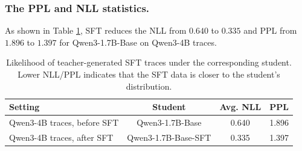 \subsubsection{The PPL and NLL statistics.}


As shown in Table \ref{tab:sft_trace_likelihood}, SFT
reduces the NLL from $0.640$ to $0.335$ and PPL from $1.896$ to $1.397$ for
Qwen3-1.7B-Base on Qwen3-4B traces.



\begin{table}[h]
\centering
\small
\begin{tabular}{lccc}
\toprule
Setting & Student & Avg. NLL & PPL \\
\midrule
Qwen3-4B traces, before SFT & Qwen3-1.7B-Base & 0.640 & 1.896 \\
Qwen3-4B traces, after SFT  & Qwen3-1.7B-Base-SFT & 0.335 & 1.397 \\
\bottomrule
\end{tabular}
\caption{
Likelihood of teacher-generated SFT traces under the corresponding student.
Lower NLL/PPL indicates that the SFT data is closer to the student's distribution.
}
\label{tab:sft_trace_likelihood}
\end{table}


